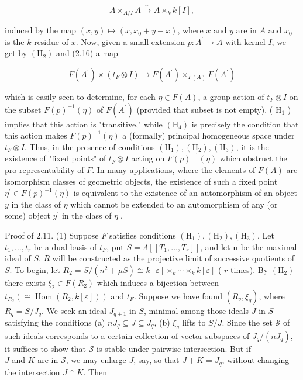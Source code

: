 \documentclass[10pt]{article}
\begin{document}
\begin{equation*}
A \times_{A / I} A \xrightarrow{\sim} A \times_{k} k[I], \tag{2.16}
\end{equation*}


induced by the map $(x, y) \mapsto\left(x, x_{0}+y-x\right)$, where $x$ and $y$ are in $A$ and $x_{0}$ is the $k$ residue of $x$. Now, given a small extension $p: A^{\prime} \rightarrow A$ with kernel $I$, we get by $\left(\mathrm{H}_{2}\right)$ and (2.16) a map


\begin{equation*}
F\left(A^{\prime}\right) \times\left(t_{F} \otimes I\right) \rightarrow F\left(A^{\prime}\right) \times_{F(A)} F\left(A^{\prime}\right) \tag{2.17}
\end{equation*}


which is easily seen to determine, for each $\eta \in F(A)$, a group action of $t_{F} \otimes I$ on the subset $F(p)^{-1}(\eta)$ of $F\left(A^{\prime}\right)$ (provided that subset is not empty). ( $\mathrm{H}_{1}$ ) implies that this action is "transitive," while $\left(\mathrm{H}_{4}\right)$ is precisely the condition that this action makes $F(p)^{-1}(\eta)$ a (formally) principal homogeneous space under $t_{F} \otimes I$. Thus, in the presence of conditions $\left(\mathrm{H}_{1}\right),\left(\mathrm{H}_{2}\right),\left(\mathrm{H}_{3}\right)$, it is the existence of "fixed points" of $t_{F} \otimes I$ acting on $F(p)^{-1}(\eta)$ which obstruct the pro-representability of $F$. In many applications, where the elements of $F(A)$ are isomorphism classes of geometric objects, the existence of such a fixed point $\eta^{\prime} \in F(p)^{-1}(\eta)$ is equivalent to the existence of an automorphism of an object $y$ in the class of $\eta$ which cannot be extended to an automorphism of any (or some) object $y^{\prime}$ in the class of $\eta^{\prime}$.

Proof of 2.11. (1) Suppose $F$ satisfies conditions $\left(\mathrm{H}_{1}\right),\left(\mathrm{H}_{2}\right),\left(\mathrm{H}_{3}\right)$. Let $t_{1}, \ldots, t_{r}$ be a dual basis of $t_{F}$, put $S=\Lambda\left[\left[T_{1}, \ldots, T_{r}\right]\right]$, and let $\boldsymbol{n}$ be the maximal ideal of $S$. $R$ will be constructed as the projective limit of successive quotients of $S$. To begin, let $R_{2}=S /\left(n^{2}+\mu S\right) \cong k[\varepsilon] \times_{k} \cdots \times_{k} k[\varepsilon]$ ( $r$ times). By $\left(\mathrm{H}_{2}\right)$ there exists $\xi_{2} \in F\left(R_{2}\right)$ which induces a bijection between $t_{R_{2}}\left(\cong \operatorname{Hom}\left(R_{2}, k[\varepsilon]\right)\right)$ and $t_{F}$. Suppose we have found $\left(R_{q}, \xi_{q}\right)$, where $R_{q}=S / J_{q}$. We seek an ideal $J_{q+1}$ in $S$, minimal among those ideals $J$ in $S$ satisfying the conditions (a) $n J_{q} \subseteq J \subseteq J_{q}$, (b) $\xi_{q}$ lifts to $S / J$. Since the set $\mathscr{S}$ of such ideals corresponds to a certain collection of vector subspaces of $J_{q} /\left(n J_{q}\right)$, it suffices to show that $\mathscr{S}$ is stable under pairwise intersection. But if\\
$J$ and $K$ are in $\mathscr{S}$, we may enlarge $J$, say, so that $J+K=J_{q}$, without changing the intersection $J \cap K$. Then
\end{document}
